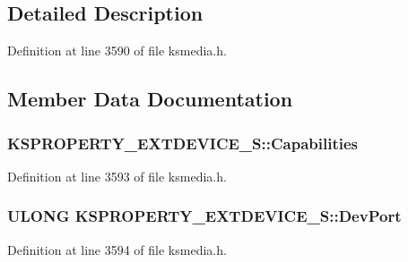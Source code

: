 \subsection{Detailed Description}


Definition at line 3590 of file ksmedia.\+h.



\subsection{Member Data Documentation}
\subsubsection[{\texorpdfstring{Capabilities}{Capabilities}}]{ K\+S\+P\+R\+O\+P\+E\+R\+T\+Y\+\_\+\+E\+X\+T\+D\+E\+V\+I\+C\+E\+\_\+\+S\+::\+Capabilities}\hypertarget{struct_k_s_p_r_o_p_e_r_t_y___e_x_t_d_e_v_i_c_e___s_ab99e72e90c7b58dc6d16e684fdb0a0c1}{}\label{struct_k_s_p_r_o_p_e_r_t_y___e_x_t_d_e_v_i_c_e___s_ab99e72e90c7b58dc6d16e684fdb0a0c1}


Definition at line 3593 of file ksmedia.\+h.

\subsubsection[{\texorpdfstring{Dev\+Port}{DevPort}}]{\setlength{\rightskip}{0pt plus 5cm}U\+L\+O\+NG K\+S\+P\+R\+O\+P\+E\+R\+T\+Y\+\_\+\+E\+X\+T\+D\+E\+V\+I\+C\+E\+\_\+\+S\+::\+Dev\+Port}\hypertarget{struct_k_s_p_r_o_p_e_r_t_y___e_x_t_d_e_v_i_c_e___s_a6811bf6f44ea23f501a5369d5e3c9fa2}{}\label{struct_k_s_p_r_o_p_e_r_t_y___e_x_t_d_e_v_i_c_e___s_a6811bf6f44ea23f501a5369d5e3c9fa2}


Definition at line 3594 of file ksmedia.\+h.

